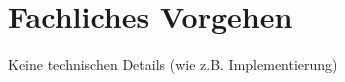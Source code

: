 \chapter{Fachliches Vorgehen}
\label{Fachliches_Vorgehen}

Keine technischen Details (wie z.B. Implementierung)








